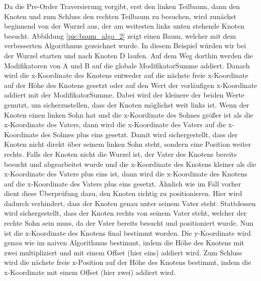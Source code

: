 Da die Pre-Order Traversierung vorgibt, erst den linken Teilbaum, dann den Knoten und zum Schluss den rechten Teilbaum zu besuchen,
wird zunächst beginnend von der Wurzel aus, der am weitesten links unten stehende Knoten besucht. Abbildung \ref{pic:baum_algo_2}
zeigt einen Baum, welcher mit dem verbesserten Algorithmus gezeichnet wurde. In diesem Beispiel würden wir bei der Wurzel starten 
und nach Knoten D laufen. Auf dem Weg dorthin werden die Modifikatoren von A und B auf die globale ModifikatorSumme addiert.
Danach wird die x-Koordinate des Knotens entweder auf die nächste freie x-Koordinate auf der Höhe des Knotens gesetzt oder auf den
Wert der vorläufigen x-Koordinate addiert mit der ModifikatorSumme. Dabei wird der kleinere der beiden Werte genutzt, um sicherzustellen,
dass der Knoten möglichst weit links ist. Wenn der Knoten einen linken Sohn hat und die x-Koordinate des Sohnes größer ist als
die x-Koordinate des Vaters, dann wird die x-Koordinate des Vaters auf die x-Koordinate des Sohnes plus eins gesetzt. 
Damit wird sichergestellt, dass der Knoten nicht direkt über seinem linken Sohn steht, sondern eine Position weiter rechts.
Falls der Knoten nicht die Wurzel ist, der Vater des Knotens bereits besucht und abgearbeitet wurde und die x-Koordinate des Knotens
kleiner als die x-Koordinate des Vaters plus eins ist, dann wird die x-Koordinate des Knotens auf die x-Koordinate des Vaters plus eins gesetzt.
Ähnlich wie im Fall vorher dient diese Überprüfung dazu, den Knoten richtig zu positionieren. Hier wird dadurch verhindert,
dass der Knoten genau unter seinem Vater steht. Stattdessen wird sichergestellt, dass der Knoten rechts von seinem Vater steht,
welcher der rechte Sohn sein muss, da der Vater bereits besucht und positioniert wurde. Nun ist die x-Koordinate des Knotens final
bestimmt worden. Die y-Koordinate wird genau wie im naiven Algorithmus bestimmt, indem die Höhe des Knotens mit zwei multipliziert
und mit einem Offset (hier eins) addiert wird. Zum Schluss wird die nächste freie x-Position auf der Höhe des Knotens bestimmt,
indem die x-Koordinate mit einem Offset (hier zwei) addiert wird. 


